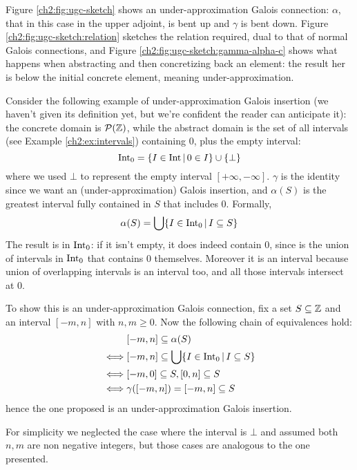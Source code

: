Figure \ref{ch2:fig:ugc-sketch} shows an under-approximation Galois connection: $\alpha$, that in this case in the upper adjoint, is bent up and $\gamma$ is bent down. Figure \ref{ch2:fig:ugc-sketch:relation} sketches the relation required, dual to that of normal Galois connections, and Figure \ref{ch2:fig:ugc-sketch:gamma-alpha-c} shows what happens when abstracting and then concretizing back an element: the result her is below the initial concrete element, meaning under-approximation.
\begin{example}\label{ch2:ex:intervals-0}
	Consider the following example of under-approximation Galois insertion (we haven't given its definition yet, but we're confident the reader can anticipate it): the concrete domain is $\mathcal{P}(\mathbb{Z})$, while the abstract domain is the set of all intervals (see Example \ref{ch2:ex:intervals}) containing $0$, plus the empty interval:
	\[
	\text{Int}_0 = \{ I \in \text{Int} \,\vert\, 0 \in I \} \cup \{ \bot \}
	\]
	where we used $\bot$ to represent the empty interval $[+\infty, -\infty]$.
	$\gamma$ is the identity since we want an (under-approximation) Galois insertion, and $\alpha(S)$ is the greatest interval fully contained in $S$ that includes $0$. Formally,
	\begin{align*}
		\alpha(S) = \bigcup \{ I \in \text{Int}_0 \,\vert\, I \subseteq S \}
	\end{align*}
	The result is in $\text{Int}_0$: if it isn't empty, it does indeed contain $0$, since is the union of intervals in $\text{Int}_0$ that contains $0$ themselves. Moreover it is an interval because union of overlapping intervals is an interval too, and all those intervals intersect at $0$.

	To show this is an under-approximation Galois connection, fix a set $S \subseteq \mathbb{Z}$ and an interval $[-m, n]$ with $n, m \ge 0$.
	Now the following chain of equivalences hold:
	\begin{align*}
		&[-m, n] \subseteq \alpha(S) \\
		\iff &[-m, n] \subseteq \bigcup \{ I \in \text{Int}_0 \,\vert\, I \subseteq S \} \\
		\iff &[-m, 0] \subseteq S, [0, n] \subseteq S \\
		\iff &\gamma([-m, n]) = [-m, n] \subseteq S
	\end{align*}
	hence the one proposed is an under-approximation Galois insertion.

	For simplicity we neglected the case where the interval is $\bot$ and assumed both $n, m$ are non negative integers, but those cases are analogous to the one presented.
\end{example}

